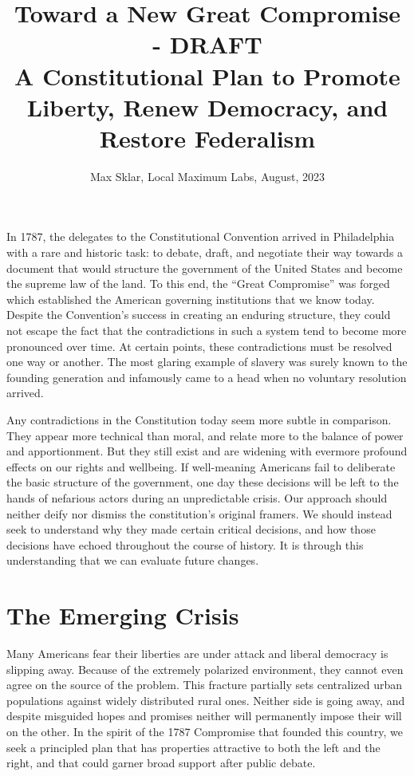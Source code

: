 \documentclass{article}
\newcommand{\quotes}[1]{``#1''}
\begin{document}
\parindent=0in
\parskip=12pt

\title{
  Toward a New Great Compromise - DRAFT \\
  \large{
    A Constitutional Plan to Promote Liberty, Renew Democracy, and Restore Federalism
  }
}

\author{Max Sklar, Local Maximum Labs, August, 2023}
\date{}

\maketitle

In 1787, the delegates to the Constitutional Convention arrived in Philadelphia with a rare and historic task: to debate, draft, and negotiate their way towards a document that would structure the government of the United States and become the supreme law of the land. To this end, the \quotes{Great Compromise} was forged which established the American governing institutions that we know today. Despite the Convention's success in creating an enduring structure, they could not escape the fact that the contradictions in such a system tend to become more pronounced over time. At certain points, these contradictions must be resolved one way or another. The most glaring example of slavery was surely known to the founding generation and infamously came to a head when no voluntary resolution arrived.

Any contradictions in the Constitution today seem more subtle in comparison. They appear more technical than moral, and relate more to the balance of power and apportionment. But they still exist and are widening with evermore profound effects on our rights and wellbeing. If well-meaning Americans fail to deliberate the basic structure of the government, one day these decisions will be left to the hands of nefarious actors during an unpredictable crisis. Our approach should neither deify nor dismiss the constitution's original framers. We should instead seek to understand why they made certain critical decisions, and how those decisions have echoed throughout the course of history. It is through this understanding that we can evaluate future changes.

\section{The Emerging Crisis}

Many Americans fear their liberties are under attack and liberal democracy is slipping away. Because of the extremely polarized environment, they cannot even agree on the source of the problem. This fracture partially sets centralized urban populations against widely distributed rural ones. Neither side is going away, and despite misguided hopes and promises neither will permanently impose their will on the other. In the spirit of the 1787 Compromise that founded this country, we seek a principled plan that has properties attractive to both the left and the right, and that could garner broad support after public debate.
\end{document}
